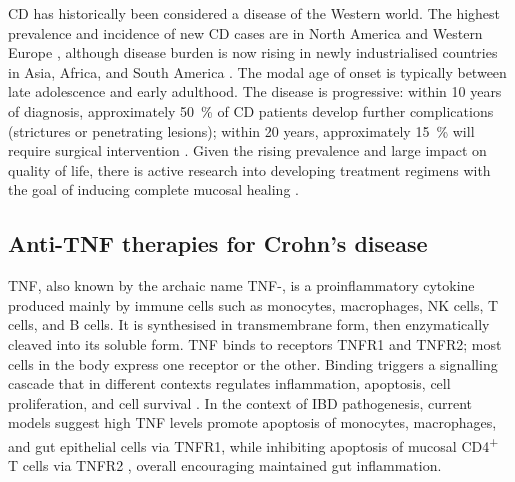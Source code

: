 \gls{CD} has historically been considered a disease of the Western world.
The highest prevalence and incidence of new \gls{CD} cases are in North America and Western Europe \autocite{roda2020CrohnDisease},
although disease burden is now rising in newly industrialised countries in Asia, Africa, and South America \autocite{kaplan2015GlobalBurdenIBD,alatab2020GlobalRegionalNational}.
The modal age of onset is typically between late adolescence and early adulthood.
The disease is progressive:
within 10 years of diagnosis, approximately \SI{50}{\percent} of \gls{CD} patients develop further complications (strictures or penetrating lesions); within 20 years, approximately \SI{15}{\percent} will require surgical intervention \autocite{roda2020CrohnDisease}.
Given the rising prevalence and large impact on quality of life, there is active research into developing treatment regimens with the goal of inducing complete mucosal healing \autocite{levin2016MechanismActionAntiTNF,roda2020CrohnDisease}.

\subsection{Anti-TNF therapies for Crohn's disease}

\Gls{TNF}, also known by the archaic name \gls{TNF}\nobreakdash-\textalpha, is a proinflammatory cytokine produced mainly by immune cells such as monocytes, macrophages, \gls{NK} cells, T cells, and B cells.
It is synthesised in transmembrane form, then enzymatically cleaved into its soluble form.
\gls{TNF} binds to receptors TNFR1 and TNFR2; most cells in the body express one receptor or the other.
Binding triggers a signalling cascade that in different contexts regulates inflammation, apoptosis, cell proliferation, and cell survival \autocite{aggarwal2003SignallingPathwaysTNF,kalliolias2016TNFBiologyPathogenic,digby-bell2019InterrogatingHostImmunity}.
In the context of \gls{IBD} pathogenesis, 
current models suggest high \gls{TNF} levels promote apoptosis of monocytes, macrophages, and gut epithelial cells via TNFR1, while inhibiting apoptosis of mucosal CD4\textsuperscript{+} T cells via TNFR2 \autocite{levin2016MechanismActionAntiTNF,adegbola2018AntiTNFTherapyCrohn,digby-bell2019InterrogatingHostImmunity},
overall encouraging maintained gut inflammation.

